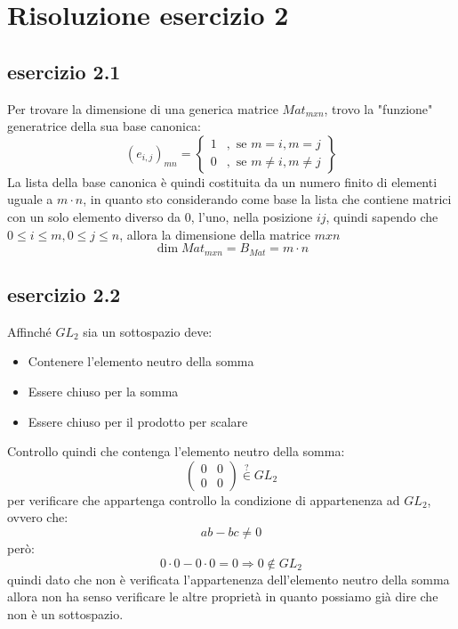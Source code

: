 \documentclass[a4paper,12pt]{article}
\begin{document}
	\section{Risoluzione esercizio 2}
	\subsection{esercizio 2.1}
	Per trovare la dimensione di una generica matrice $Mat_{mxn}$, trovo la "funzione" generatrice della sua base canonica:
	\[(e_{i,j})_{mn} = \left\{\begin{aligned}
		1 &, \text{ se } m =i, m = j\\
		0 &, \text{ se } m \not =i, m \not = j
	\end{aligned}\right\}\]
	La lista della base canonica è quindi costituita da un numero finito di elementi uguale a $m \cdot n$, in quanto sto considerando come base la lista che contiene matrici con un solo elemento diverso da 0, l'uno, nella posizione $ij$, quindi sapendo che $0 \leq i \leq m, 0 \leq j \leq n$, allora la dimensione della matrice $m x n$
	\[\dim Mat_{mxn} = B_{Mat} = m \cdot n\]
	\subsection{esercizio 2.2}
	Affinché $GL_2$ sia un sottospazio deve:
	\begin{itemize}
		\item Contenere l'elemento neutro della somma
		\item Essere chiuso per la somma
		\item Essere chiuso per il prodotto per scalare
	\end{itemize}
	Controllo quindi che contenga l'elemento neutro della somma:
	\[\begin{pmatrix} 0 & 0 \\ 0 & 0 \end{pmatrix} \overset{?}{\in} GL_2\]
	per verificare che appartenga controllo la condizione di appartenenza ad $GL_2$, ovvero che:
	\[ab - bc \not = 0\]
	però:
	\[0 \cdot 0 - 0 \cdot 0 = 0 \Rightarrow 0 \not \in GL_2\]
	quindi dato che non è verificata l'appartenenza dell'elemento neutro della somma allora non ha senso verificare le altre proprietà in quanto possiamo già dire che non è un sottospazio.
\end{document}
